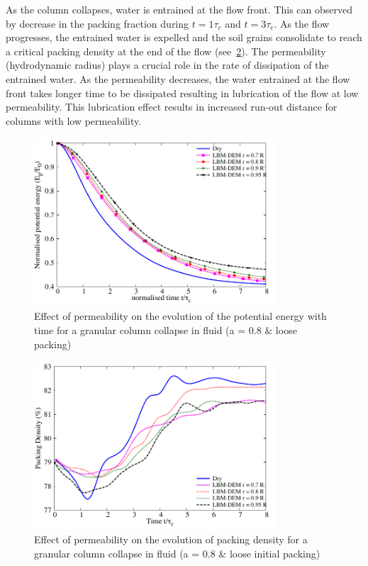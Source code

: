 As the column collapses, water is entrained at the flow front. This can 
observed by decrease in the packing fraction during $t = 1\tau_c$ and $t = 
3\tau_c$. As the flow progresses, the entrained water is expelled and the soil 
grains consolidate to reach a critical packing density at the end of the flow 
(see~\cref{fig:Packing_Density_a08_loose}). The permeability (hydrodynamic 
radius) plays a crucial role in the rate of dissipation of the entrained water. 
As the permeability decreases, the water entrained at the flow front takes 
longer time to be dissipated resulting in lubrication of the flow at low 
permeability. This lubrication effect results in increased run-out distance for 
columns with low permeability.

\begin{figure}
	\centering
    \includegraphics[width=0.8\textwidth]{PE_a08_loose}
    \caption{Effect of permeability on the evolution of the potential energy 
    with time for a granular column collapse in fluid (a = 0.8 \& loose 
    packing)}
    \label{fig:PE_a08_loose}
\end{figure}


\begin{figure}
	\centering
    \includegraphics[width=0.8\textwidth]{Packing_Density_a08_loose}
    \caption{Effect of permeability on the evolution of packing density for a 
    granular column collapse in fluid (a = 0.8 \& loose initial packing)}
    \label{fig:Packing_Density_a08_loose}
\end{figure}

